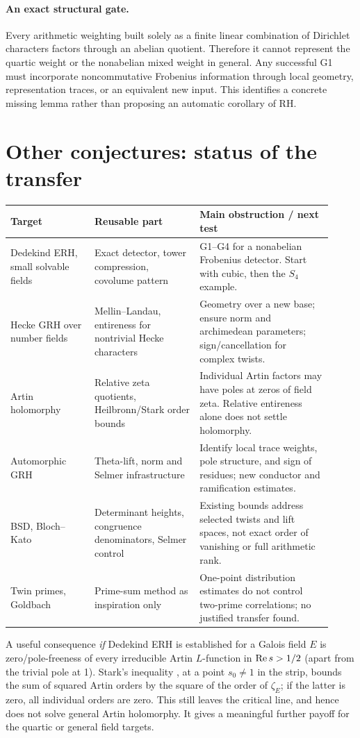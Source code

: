 \documentclass[11pt]{article}
\theoremstyle{remark}\newtheorem{remark}[theorem]{Remark}
\begin{document}
\paragraph{An exact structural gate.} Every arithmetic weighting built solely as a finite linear combination of Dirichlet characters factors through an abelian quotient. Therefore it cannot represent the quartic weight or the nonabelian mixed weight in general. Any successful G1 must incorporate noncommutative Frobenius information through local geometry, representation traces, or an equivalent new input. This identifies a concrete missing lemma rather than proposing an automatic corollary of RH.

\section{Other conjectures: status of the transfer}
\begin{center}\small
\begin{tabular}{@{}p{0.24\linewidth}p{0.30\linewidth}p{0.38\linewidth}@{}}
\toprule Target & Reusable part & Main obstruction / next test\\\midrule
Dedekind ERH, small solvable fields & Exact detector, tower compression, covolume pattern & G1--G4 for a nonabelian Frobenius detector. Start with cubic, then the $S_4$ example.\\[3pt]
Hecke GRH over number fields & Mellin--Landau, entireness for nontrivial Hecke characters & Geometry over a new base; ensure norm and archimedean parameters; sign/cancellation for complex twists.\\[3pt]
Artin holomorphy & Relative zeta quotients, Heilbronn/Stark order bounds & Individual Artin factors may have poles at zeros of field zeta. Relative entireness alone does not settle holomorphy.\\[3pt]
Automorphic GRH & Theta-lift, norm and Selmer infrastructure & Identify local trace weights, pole structure, and sign of residues; new conductor and ramification estimates.\\[3pt]
BSD, Bloch--Kato & Determinant heights, congruence denominators, Selmer control & Existing bounds address selected twists and lift spaces, not exact order of vanishing or full arithmetic rank.\\[3pt]
Twin primes, Goldbach & Prime-sum method as inspiration only & One-point distribution estimates do not control two-prime correlations; no justified transfer found.\\\bottomrule
\end{tabular}
\end{center}
A useful consequence \emph{if} Dedekind ERH is established for a Galois field $E$ is zero/pole-freeness of every irreducible Artin $L$-function in $\operatorname{Re} s>1/2$ (apart from the trivial pole at 1). Stark's inequality \cite{stark}, at a point $s_0\ne1$ in the strip, bounds the sum of squared Artin orders by the square of the order of $\zeta_E$; if the latter is zero, all individual orders are zero. This still leaves the critical line, and hence does not solve general Artin holomorphy. It gives a meaningful further payoff for the quartic or general field targets.
\end{document}
